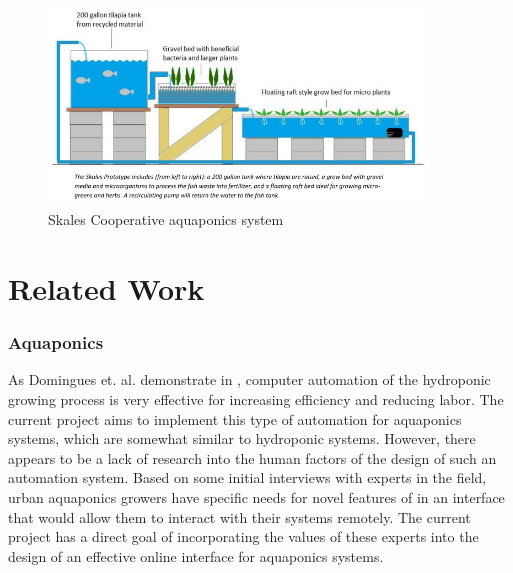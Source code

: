 \documentclass{sigchi}
\begin{document}
\begin{figure}
\centering
\includegraphics[width=0.9\textwidth]{systemDiagram}
\caption{Skales Cooperative aquaponics system}
\label{fig:skales}
\end{figure}

\section{Related Work}
\subsubsection{Aquaponics}

As Domingues et. al. demonstrate in \cite{automated}, computer automation of the hydroponic growing process is very effective for increasing efficiency and reducing labor. The current project aims to implement this type of automation for aquaponics systems, which are somewhat similar to hydroponic systems. However, there appears to be a lack of research into the human factors of the design of such an automation system. Based on some initial interviews with experts in the field, urban aquaponics growers have specific needs for novel features of in an interface that would allow them to interact with their systems remotely. The current project has a direct goal of incorporating the values of these experts into the design of an effective online interface for aquaponics systems. 
\end{document}

